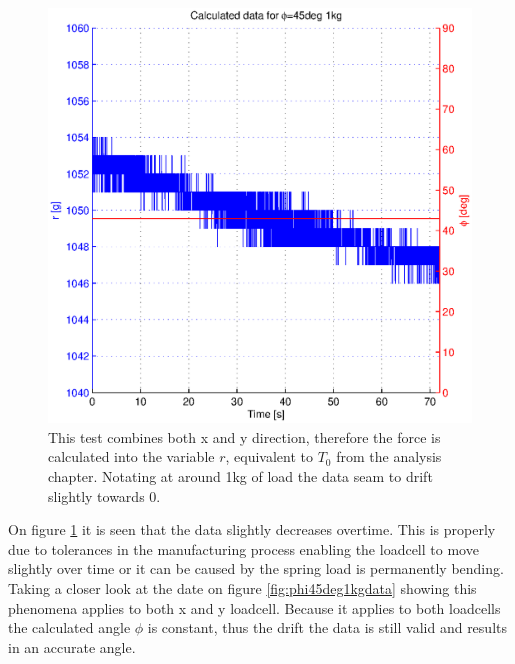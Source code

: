 \begin{figure}[H]
\centering
\includegraphics[scale=1]{graphics/gcs_test/phi45deg1kg.eps}
\caption{This test combines both x and y direction, therefore the force is calculated into the variable $r$, equivalent to $T_0$ from the analysis chapter. Notating at around 1kg of load the data seam to drift slightly towards 0.}
\label{fig:phi45deg1kg}
\end{figure}

On figure \ref{fig:phi45deg1kg} it is seen that the data slightly decreases overtime. This is properly due to tolerances in the manufacturing process enabling the loadcell to move slightly over time or it can be caused by the spring load is permanently bending. Taking a closer look at the date on figure \ref{fig:phi45deg1kgdata} showing this phenomena applies to both x and y loadcell. Because it applies to both loadcells the calculated angle $\phi$ is constant, thus the drift the data is still valid and results in an accurate angle.

